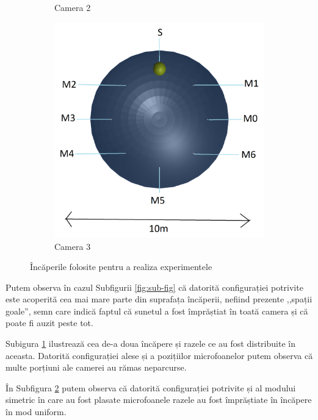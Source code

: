 \begin{figure}[!htb]
\begin{subfigure}[b]{.3\textwidth}
			\caption{Camera 2}
			\label{fig:sub-second}
		\end{subfigure}
		\hfill
		\begin{subfigure}[b]{.3\textwidth}
			\centering
			\includegraphics[width=1\linewidth]{imagini/roomC.png}
			\caption{Camera 3}
			\label{fig:sub-third3}
		\end{subfigure}
		
		\caption{Încăperile folosite pentru a realiza experimentele}
		\label{fig:Fig20}
	\end{figure}
	
	Putem observa în cazul Subfigurii \ref{fig:sub-fig} că datorită configurației potrivite este acoperită cea mai mare parte din suprafața încăperii, nefiind prezente ,,spații goale'', semn care indică faptul că sunetul a fost împrăștiat în toată camera și că poate fi auzit peste tot.
	
	Subigura \ref{fig:sub-second} ilustrează cea de-a doua încăpere și razele ce au fost distribuite în aceasta. Datorită configurației alese și a pozițiilor microfoanelor putem observa că multe porțiuni ale camerei au rămas neparcurse.
	
	În Subfigura \ref{fig:sub-third3} putem observa că datorită configurației potrivite și al modului simetric în care au fost plasate microfoanele razele au fost împrăștiate în încăpere în mod uniform.
	
